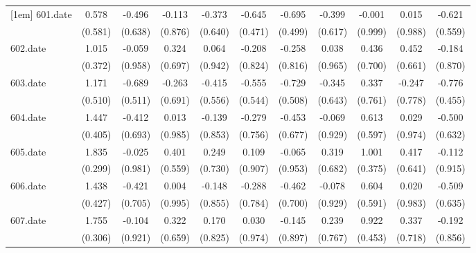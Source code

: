 \begin{tabular}{l*{10}{c}}
[1em]
601.date    &       0.578&      -0.496&      -0.113&      -0.373&      -0.645&      -0.695&      -0.399&      -0.001&       0.015&      -0.621\\
            &     (0.581)&     (0.638)&     (0.876)&     (0.640)&     (0.471)&     (0.499)&     (0.617)&     (0.999)&     (0.988)&     (0.559)\\
[1em]
602.date    &       1.015&      -0.059&       0.324&       0.064&      -0.208&      -0.258&       0.038&       0.436&       0.452&      -0.184\\
            &     (0.372)&     (0.958)&     (0.697)&     (0.942)&     (0.824)&     (0.816)&     (0.965)&     (0.700)&     (0.661)&     (0.870)\\
[1em]
603.date    &       1.171&      -0.689&      -0.263&      -0.415&      -0.555&      -0.729&      -0.345&       0.337&      -0.247&      -0.776\\
            &     (0.510)&     (0.511)&     (0.691)&     (0.556)&     (0.544)&     (0.508)&     (0.643)&     (0.761)&     (0.778)&     (0.455)\\
[1em]
604.date    &       1.447&      -0.412&       0.013&      -0.139&      -0.279&      -0.453&      -0.069&       0.613&       0.029&      -0.500\\
            &     (0.405)&     (0.693)&     (0.985)&     (0.853)&     (0.756)&     (0.677)&     (0.929)&     (0.597)&     (0.974)&     (0.632)\\
[1em]
605.date    &       1.835&      -0.025&       0.401&       0.249&       0.109&      -0.065&       0.319&       1.001&       0.417&      -0.112\\
            &     (0.299)&     (0.981)&     (0.559)&     (0.730)&     (0.907)&     (0.953)&     (0.682)&     (0.375)&     (0.641)&     (0.915)\\
[1em]
606.date    &       1.438&      -0.421&       0.004&      -0.148&      -0.288&      -0.462&      -0.078&       0.604&       0.020&      -0.509\\
            &     (0.427)&     (0.705)&     (0.995)&     (0.855)&     (0.784)&     (0.700)&     (0.929)&     (0.591)&     (0.983)&     (0.635)\\
[1em]
607.date    &       1.755&      -0.104&       0.322&       0.170&       0.030&      -0.145&       0.239&       0.922&       0.337&      -0.192\\
            &     (0.306)&     (0.921)&     (0.659)&     (0.825)&     (0.974)&     (0.897)&     (0.767)&     (0.453)&     (0.718)&     (0.856)\\

\end{tabular}
